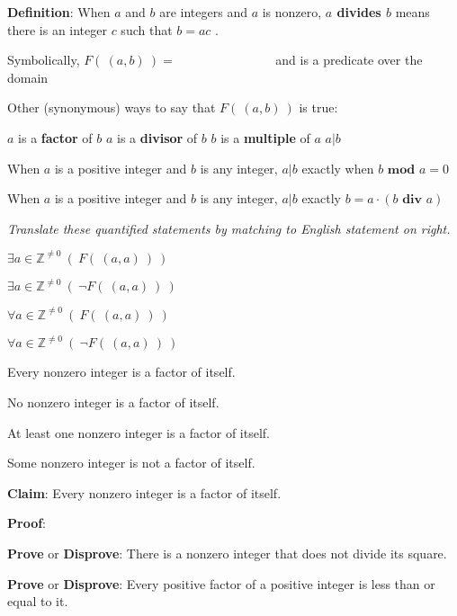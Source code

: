 \documentclass[12pt, oneside]{article}
\begin{document}
{\bf Definition}: When $a$ and $b$ are integers and $a$ is nonzero, 
{\bf $a$ divides $b$} means there is an integer $c$ such that $b = ac$ . 


Symbolically, $F(~(a,b)~) = \phantom{\exists c\in \mathbb{Z}~(b=ac)}$
and is  a predicate over the domain \underline{}


Other (synonymous) ways to say that $F(~(a,b)~)$ is true: 
\begin{center}
$a$ is a {\bf factor} of $b$
\qquad 
$a$ is a {\bf divisor} of $b$
\qquad  $b$ is a {\bf multiple} of $a$
\qquad
$a | b$
\end{center}

When $a$ is a positive integer and $b$ is any integer, $a | b$
exactly when $b \textbf{ mod } a = 0$

When $a$ is a positive integer and $b$ is any integer, $a | b$
exactly $b = a \cdot (b \textbf{ div } a)$ 

{\it Translate these quantified statements by matching to English statement on right.}

\begin{multicols}{2}
$\exists a\in \mathbb{Z}^{\neq 0} ~(~F(~(a,a)~)~)$

$\exists a\in \mathbb{Z}^{\neq 0} ~(~\lnot F(~(a,a)~)~)$

$\forall a\in \mathbb{Z}^{\neq 0} ~(~F(~(a,a)~)~)$

$\forall a\in \mathbb{Z}^{\neq 0} ~(~\lnot F(~(a,a)~)~)$


Every nonzero integer is a factor of itself.

No nonzero integer is a factor of itself.

At least one nonzero integer is a factor of itself.

Some nonzero integer is not a factor of itself.
\end{multicols} 

{\bf Claim}: Every nonzero integer is a factor of itself.

{\bf Proof}: 


\vspace{150pt}


{\bf Prove} or {\bf Disprove}: There is a nonzero integer that does not divide its square.



\vspace{150pt}

{\bf Prove} or {\bf Disprove}: Every positive factor of a positive integer is less than or equal to it.
\end{document}
